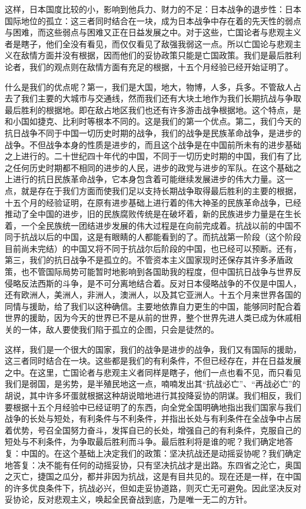这样，日本国度比较的小，影响到他兵力、财力的不足：日本战争的退步性：日本国际地位的孤立：这三者同时结合在一块，成为日本战争中存在着的先天性的弱点与困难，而这些弱点与困难又正在日益发展之中。对于这些，亡国论者与悲观主义者是瞎子，他们全没有看见，而仅仅看见了敌强我弱这一点。所以亡国论与悲观主义在敌情方面并没有根据，因而他们的妥协政策只能是亡国政策。我们是最后胜利论者，我们的观点则在敌情方面有充足的根据，十五个月经验已经开始证明了。

什么是我们的优点呢？第一，我们是大国，地大，物博，人多，兵多。不管敌人占去了我们主要的大城市与交通线，然而我们还有大块土地作为我们长期抗战与争取最后胜利的根据地。即在敌占地区我们也还有许多游击战争根据地。这个特点，是和小国如捷克、比利时等根本不同的。这是我们的第一个优点。第二，我们今天的抗日战争不同于中国一切历史时期的战争，我们的战争是民族革命战争，是进步的战争。不但战争本身的性质是进步的，而且这个战争是在中国前所未有的进步基础之上进行的。二十世纪四十年代的中国，不同于一切历史时期的中国，我们有了比之任何历史时期都不相同的进步的人民，进步的政党与进步的军队。在这个基础之上进行的抗日民族革命战争，它本身包含着可能继续发展进步的伟大力量。这一点，就是存在于我们方面而使我们足以支持长期战争取得最后胜利的主要的根据，十五个月的经验证明，在原有进步基础上进行着的伟大神圣的民族革命战争，已经推动了全中国的进步，旧的民族腐败传统是在破坏着，新的民族进步力量是在生长着，一个全民族统一团结进步发展的伟大过程是在向前完成着。抗战以前的中国不同于抗战以后的中国，这是有眼睛的人都能看到的了。而抗战第一阶段（这个阶段目前尚未完结）的中国又将不同于抗战尔后阶段的中国，也已经可以预断。还有，第三，我们的抗日战争不是孤立的。不管资本主义国家现时还保存其许多矛盾政策，也不管国际局势可能暂时地影响到各国助我的程度，但中国抗日战争与世界反侵略反法西斯的斗争，是不可分离地结合着。反对日本侵略战争的不仅是中国人，还有欧洲人，美洲人，非洲人，澳洲人，以及其它亚洲人。十五个月来世界各国的同情与援助，给了我们以这种确信。主要地依靠自力更生的中国，能够同时配合着世界的援助，因为今天的世界已不是从前的世界，整个世界先进人类已成为休戚相关的一体，敌人要使我们陷于孤立的企图，只会是徒然的。

这样，我们是一个很大的国家，我们的战争是进步的战争，我们又有国际的援助，这三者同时结合在一块。这些都是我们的有利条件，不但已经存在，并在日益发展之中。在这里，亡国论者与悲观主义者同样是瞎子，他们一点也看不见，而只看见我们是弱国，是劣势，是半殖民地这一点，喃喃发出其“抗战必亡”、“再战必亡”的胡说，其中许多坏蛋就根据这种胡说暗地进行其投降妥协的阴谋。我们相反，我们要根据十五个月经验中已经证明了的东西，向全党全国明确地指出我们国家与我们战争的长处与短处，有利条件与不利条件，并指出长处与有利条件在全战争中占居着优势，号召全国努力奋斗，发挥自已的长处，增强自己的有利条件，克服自己的短处与不利条件，为争取最后胜利而斗争。最后胜利将是谁的呢？我们确定地答复：中国的。在这个基础上决定我们的政策：坚决抗战还是动摇妥协呢？我们确定地答复：决不能有任何的动摇妥协，只有坚决抗战才是出路。东四省之沦亡，奥国之灭亡，捷国之瓜分，都并非因为抗战，这是有目共见的。现在还是一样，在中国的许多优良条件下，抗战必兴，但如走妥协道路，则灭亡无可避免。因此坚决反对妥协论，反对悲观主义，唤起全民奋战到底，乃是唯一无二的方针。

